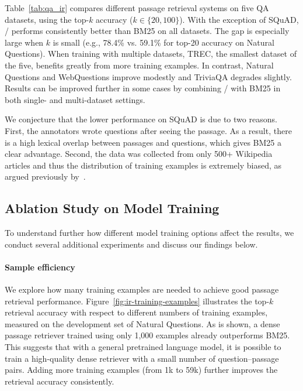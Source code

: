 Table~\ref{tab:qa_ir} compares different passage retrieval systems on five QA datasets, using the top-$k$ accuracy ($k \in \{20,100\}$).
With the exception of SQuAD, \model/ performs consistently better than BM25 on all datasets.  The gap is especially large when $k$ is small (e.g., 78.4\% vs. 59.1\% for top-20 accuracy on Natural Questions).
When training with multiple datasets, TREC, the smallest dataset of the five, benefits greatly from more training examples.  In contrast, Natural Questions and WebQuestions improve modestly and TriviaQA degrades slightly.
Results can be improved further in some cases by combining \model/ with BM25 in both single- and multi-dataset settings.

We conjecture that the lower performance on SQuAD is due to two reasons. First, the annotators wrote questions after seeing the passage.  As a result, there is a high lexical overlap between passages and questions, which gives BM25 a clear advantage.  Second, the data was collected from only 500+ Wikipedia articles and thus
the distribution of training examples is extremely biased, as argued previously by~.



\subsection{Ablation Study on Model Training}
\label{subsec:ablation-retrieval}

To understand further how different model training options affect the results, we conduct several additional experiments and discuss our findings below.

\paragraph{Sample efficiency}

We explore how many training examples are needed to achieve good passage retrieval performance. %
Figure~\ref{fig:ir-training-examples} illustrates the top-$k$ retrieval accuracy with respect to different numbers of training examples,
measured on the development set of Natural Questions.
As is shown, a dense passage retriever trained using only 1,000 examples already outperforms BM25. 
This suggests that with a general pretrained language model, it is possible to train a high-quality dense retriever with a small number of question--passage pairs.
Adding more training examples (from 1k to 59k) further improves the retrieval accuracy consistently.

